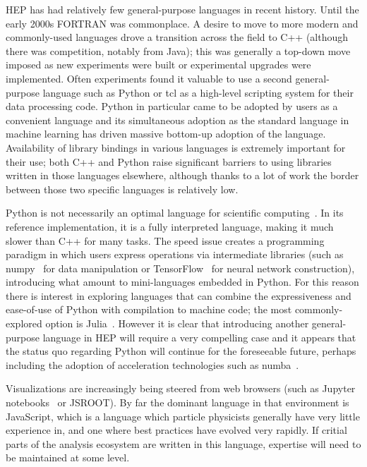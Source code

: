 HEP has had relatively few general-purpose languages in recent history. Until the early 2000s FORTRAN was commonplace. A desire to move to more modern and commonly-used languages drove a transition across the field to C++ (although there was competition, notably from Java); this was generally a top-down move imposed as new experiments were built or experimental upgrades were implemented. Often experiments found it valuable to use a second general-purpose language such as Python or tcl as a high-level scripting system for their data processing code. Python in particular came to be adopted by users as a convenient language and its simultaneous adoption as the standard language in machine learning has driven massive bottom-up adoption of the language. Availability of library bindings in various languages is extremely important for their use; both C++ and Python raise significant barriers to using libraries written in those languages elsewhere, although thanks to a lot of work the border between those two specific languages is relatively low.

Python is not necessarily an optimal language for scientific computing~\cite{876288}. In its reference implementation, it is a fully interpreted language, making it much slower than C++ for many tasks. The speed issue creates a programming paradigm in which users express operations via intermediate libraries (such as numpy~\cite{harris2020array} for data manipulation or TensorFlow~\cite{tensorflow_developers_2022_6574269} for neural network construction), introducing what amount to mini-languages embedded in Python. For this reason there is interest in exploring languages that can combine the expressiveness and ease-of-use of Python with compilation to machine code; the most commonly-explored option is Julia~\cite{Stanitzki:2020bnx}. However it is clear that introducing another general-purpose language in HEP will require a very compelling case and it appears that the status quo regarding Python will continue for the foreseeable future, perhaps including the adoption of acceleration technologies such as numba~\cite{10.1145/2833157.2833162}.

Visualizations are increasingly being steered from web browsers (such as Jupyter notebooks~\cite{soton403913} or JSROOT). By far the dominant language in that environment is JavaScript, which is a language which particle physicists generally have very little experience in, and one where best practices have evolved very rapidly. If critial parts of the analysis ecosystem are written in this language, expertise will need to be maintained at some level.


